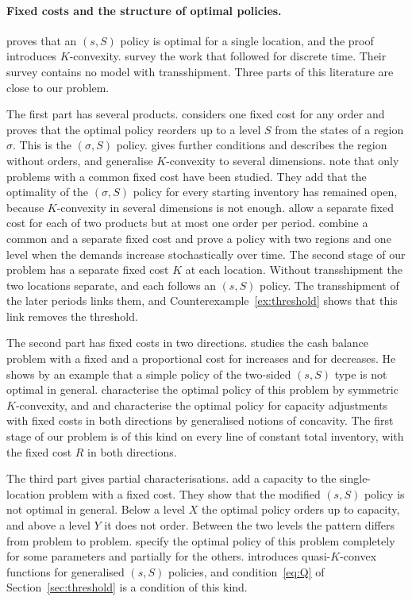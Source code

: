 \documentclass[11pt]{article}
\theoremstyle{definition}
\begin{document}
\paragraph{Fixed costs and the structure of optimal policies.}
\citet{scarf1959optimality} proves that an $(s,S)$ policy is optimal for a single location, and the proof introduces $K$-convexity. \citet{perera2023survey} survey the work that followed for discrete time. Their survey contains no model with transshipment. Three parts of this literature are close to our problem.

The first part has several products. \citet{johnson1967optimality} considers one fixed cost for any order and proves that the optimal policy reorders up to a level $S$ from the states of a region $\sigma$. This is the $(\sigma,S)$ policy. \citet{kalin1980optimality} gives further conditions and describes the region without orders, and \citet{gallego2005k} generalise $K$-convexity to several dimensions. \citet{perera2023survey} note that only problems with a common fixed cost have been studied. They add that the optimality of the $(\sigma,S)$ policy for every starting inventory has remained open, because $K$-convexity in several dimensions is not enough. \citet{firouzi2014two} allow a separate fixed cost for each of two products but at most one order per period. \citet{kong2024dynamic} combine a common and a separate fixed cost and prove a policy with two regions and one level when the demands increase stochastically over time. The second stage of our problem has a separate fixed cost $K$ at each location. Without transshipment the two locations separate, and each follows an $(s,S)$ policy. The transshipment of the later periods links them, and Counterexample~\ref{ex:threshold} shows that this link removes the threshold.

The second part has fixed costs in two directions. \citet{neave1970stochastic} studies the cash balance problem with a fixed and a proportional cost for increases and for decreases. He shows by an example that a simple policy of the two-sided $(s,S)$ type is not optimal in general. \citet{chen2009new} characterise the optimal policy of this problem by symmetric $K$-convexity, and \citet{ye2007optimal} and \citet{semple2007note} characterise the optimal policy for capacity adjustments with fixed costs in both directions by generalised notions of concavity. The first stage of our problem is of this kind on every line of constant total inventory, with the fixed cost $R$ in both directions.

The third part gives partial characterisations. \citet{shaoxiang1996xy} add a capacity to the single-location problem with a fixed cost. They show that the modified $(s,S)$ policy is not optimal in general. Below a level $X$ the optimal policy orders up to capacity, and above a level $Y$ it does not order. Between the two levels the pattern differs from problem to problem. \citet{gallego2000capacitated} specify the optimal policy of this problem completely for some parameters and partially for the others. \citet{porteus1971optimality} introduces quasi-$K$-convex functions for generalised $(s,S)$ policies, and condition~\eqref{eq:Q} of Section~\ref{sec:threshold} is a condition of this kind.
\end{document}
